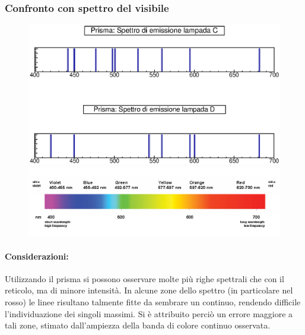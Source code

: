 \subsubsection{Confronto con spettro del visibile}
\label{sec:prisma_confronto}
%
%
    \begin{figure}[H]
    \centering
    \includegraphics[scale=0.8]{Grafici/O3_P2_2_spectrum.eps}
    \includegraphics[scale=1.2]{Grafici/VISspectrum.jpg}
    \label{fig:C3_P2_RL}
    \end{figure} 
%
\paragraph{Considerazioni:}{Utilizzando il prisma si possono osservare molte più righe spettrali che con il reticolo, ma di minore intensità. In alcune zone dello spettro (in particolare nel rosso) le linee risultano talmente fitte da sembrare un continuo, rendendo difficile l'individuazione dei singoli massimi. Si è attribuito perciò un errore maggiore a tali zone, stimato dall'ampiezza della banda di colore continuo osservata.}
